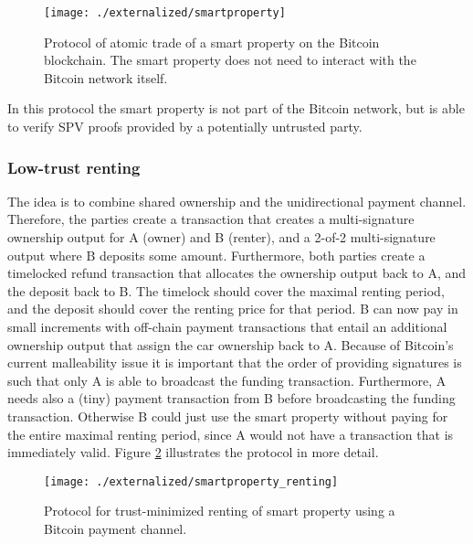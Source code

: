 \begin{figure}[!t]
    \centering
    \texttt{[image: ./externalized/smartproperty]}
    \caption{Protocol of atomic trade of a smart property on the Bitcoin blockchain. The smart property does not need to interact with the Bitcoin network itself.}
    \label{fig:smartproperty}
  \end{figure}

In this protocol the smart property is not part of the Bitcoin network, but is able to verify SPV proofs provided by a potentially untrusted party. 



\subsubsection{Low-trust renting}

The idea is to combine shared ownership and the unidirectional payment channel. Therefore, the parties create a transaction that creates a multi-signature ownership output for A (owner) and B (renter), and a 2-of-2 multi-signature output where B deposits some amount. Furthermore, both parties create a timelocked refund transaction that allocates the ownership output back to A, and the deposit back to B. The timelock should cover the maximal renting period, and the deposit should cover the renting price for that period. B can now pay in small increments with off-chain payment transactions that entail an additional ownership output that assign the car ownership back to A. Because of Bitcoin's current malleability issue it is important that the order of providing signatures is such that only A is able to broadcast the funding transaction. Furthermore, A needs also a (tiny) payment transaction from B before broadcasting the funding transaction. Otherwise B could just use the smart property without paying for the entire maximal renting period, since A would not have a transaction that is immediately valid. Figure \ref{fig:smartproperty_renting} illustrates the protocol in more detail.

\begin{figure}[!t]
    \centering
    \texttt{[image: ./externalized/smartproperty\_renting]}
    \caption{Protocol for trust-minimized renting of smart property using a Bitcoin payment channel.}
    \label{fig:smartproperty_renting}
  \end{figure}

